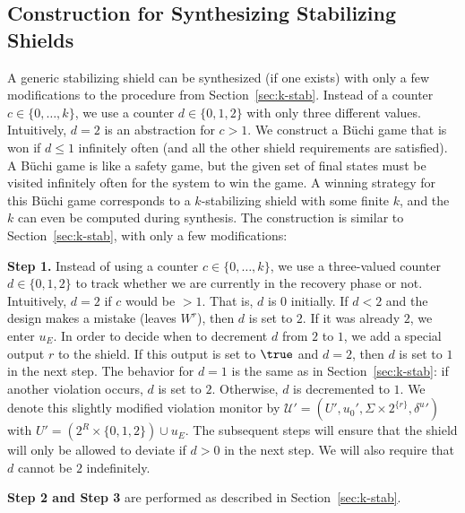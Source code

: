 \documentclass{llncs}
\newcommand{\buchi}{B\"uchi\xspace}
\newcommand{\dalph}{\Sigma}
\begin{document}
\subsection{Construction for Synthesizing Stabilizing Shields} 
\label{sec:stab-app}

A generic stabilizing shield can be synthesized (if one exists) with 
only a few modifications to the procedure from Section~\ref{sec:k-stab}. 
Instead of a counter $c\in\{0,\ldots, k\}$, we use a counter 
$d\in\{0,1,2\}$ with only three different values.  Intuitively, $d=2$ is 
an abstraction for $c > 1$.  
We construct a \buchi game that is won if $d\leq 1$ infinitely often 
(and all the other shield requirements are satisfied).  A \buchi game is 
like a safety game, but the given set of final states must be visited 
infinitely often for the system to win the game.  A winning strategy for 
this \buchi game corresponds to a $k$-stabilizing shield with some 
finite $k$, and the $k$ can even be computed during synthesis.  The 
construction is similar to Section~\ref{sec:k-stab}, with only a few 
modifications:

\noindent
\textbf{Step 1.} Instead of using a counter $c\in\{0,\ldots, k\}$, we 
use a three-valued counter $d\in\{0,1,2\}$ to track whether we are 
currently in the recovery phase or not. Intuitively, $d=2$ if $c$ would 
be $>1$. That is, $d$ is $0$ initially.  If $d < 2$ and the design 
makes a mistake (leaves $W^r$), then $d$ is set to $2$.  If it was 
already $2$, we enter $u_E$.  In order to decide when to decrement $d$ 
from $2$ to $1$, we add a special output $r$ to the shield.  If this 
output is set to $\true$ and $d=2$, then $d$ is set to $1$ in the next 
step. The behavior for $d=1$ is the same as in Section~\ref{sec:k-stab}: 
if another violation occurs, $d$ is set to $2$. Otherwise, $d$ is 
decremented to $1$.  We denote this slightly modified violation monitor 
by $\mathcal{U}' = (U', u_0', \dalph \times 2^{\{r\}}, {\delta^u}')$ 
with $U'=(2^{R} \times \{0,1,2\}) \cup {u_E}$. The subsequent steps will 
ensure that the shield will only be allowed to deviate if $d > 0$ in the 
next step.  We will also require that $d$ cannot be $2$ indefinitely.

\noindent
\textbf{Step 2 and Step 3} are performed as described in 
Section~\ref{sec:k-stab}.
\end{document}
